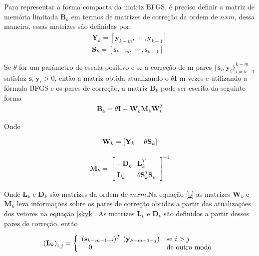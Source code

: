      Para representar a forma compacta da matriz BFGS, é preciso definir a matriz de memória limitada $\mathbf{B}_{k}$ em termos de matrizes de correção da ordem de $nxm$, dessa maneira, essas matrizes são definidas por 
     \begin{eqnarray}
     \mathbf{Y}_{k} = \left [ \mathbf{y}_{k-m},~\cdots~, \mathbf{y}_{k-1} \right ] \\
     \nonumber
     \mathbf{S}_{k} = \left [\mathbf{s}_{k-m}, ~\cdots~, \mathbf{s}_{k-1} \right ] ~
     \end{eqnarray}
     
     Se $\theta$ for um parâmetro de escala positivo e se a correção de m pares $\{\mathbf{s}_{i},\mathbf{y}_{i}\}_{i=k-1}^{k-m}$ satisfaz $\mathbf{s}_{i}~\mathbf{y}_{i} > 0$, então a matriz obtida atualizando o $\theta \mathbf{I}$ m vezes e utilizando a fórmula BFGS e os pares de correção, a matriz $\mathbf{B}_{k}$ pode ser escrita da seguinte forma
     \begin{eqnarray}
      \mathbf{B}_{k} = \theta \mathbf{I} - \mathbf{W}_{k} \mathbf{M}_{k} \mathbf{W}_{k}^{T}
      \label{b}
     \end{eqnarray}

     Onde
     
     \begin{eqnarray}
      \nonumber
      \mathbf{W}_{k}= \left [ \mathbf{Y}_{k}~~~~\large{\theta} \mathbf{S}_{k} \right ]
     \end{eqnarray}
     
      \begin{eqnarray}
      \nonumber
       \mathbf{M}_{k}=\left[\begin{array}{cc}{-\mathbf{D}_{k}} & {\mathbf{L}_{k}^{T}} \\ {\mathbf{L}_{k}} & {\theta \mathbf{S}_{k}^{T} \mathbf{S}_{k}}\end{array}\right]^{-1}
      \end{eqnarray}

       Onde $\mathbf{L}_{k}$  e $\mathbf{D}_{k}$ são matrizes da ordem de $mxm$.Na equação \ref{b} as matrizes $\mathbf{W}_{k}$ e $\mathbf{M}_{k}$ leva informações sobre os pares de correção obtidas a partir das atualizações dos vetores na equação \ref{skyk}. As matrizes $\mathbf{L}_{k}$  e $\mathbf{D}_{k}$ são definidos a partir desses pares de correção, então 
       
       \begin{eqnarray} \left(\mathbf{L}_{k} \right)_{i,j}  = \left\{ \begin{array}{rll}
          (\mathbf{s}_{k-m-1+i})^{T}~(\mathbf{y}_{k-m-1-j})  & \hbox{se}~ i > j \\
          0 ~~~~~~ ~                 ~~~~~~~~ ~~~~~~~~~ ~~~~~& \hbox{de outro modo}
          \end{array} \right.
          \label{lk}
          \end{eqnarray}

